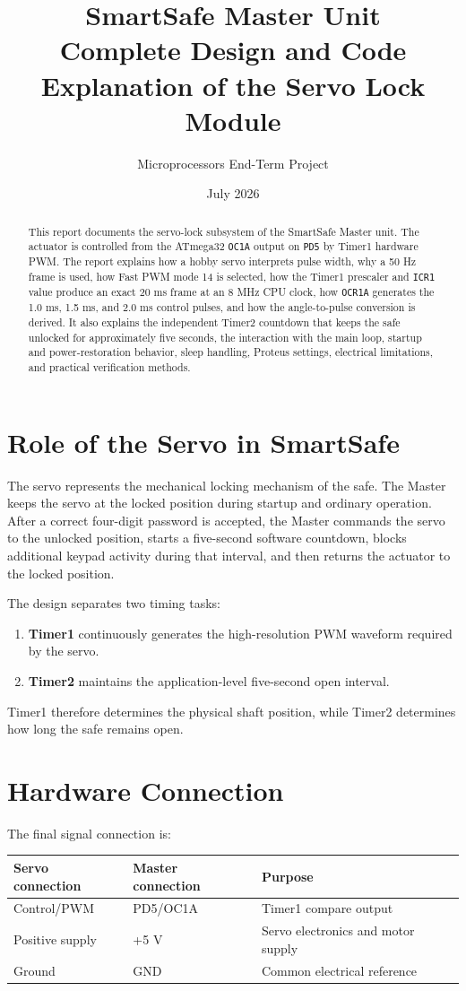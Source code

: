 \documentclass[11pt,a4paper]{article}
\title{\textbf{SmartSafe Master Unit}\\[4pt]
\Large Complete Design and Code Explanation of the Servo Lock Module}
\author{Microprocessors End-Term Project}
\date{July 2026}
\begin{document}
\maketitle
\thispagestyle{empty}

\begin{abstract}
This report documents the servo-lock subsystem of the SmartSafe Master unit. The actuator is controlled from the ATmega32 \texttt{OC1A} output on \texttt{PD5} by Timer1 hardware PWM. The report explains how a hobby servo interprets pulse width, why a 50 Hz frame is used, how Fast PWM mode 14 is selected, how the Timer1 prescaler and \texttt{ICR1} value produce an exact 20 ms frame at an 8 MHz CPU clock, how \texttt{OCR1A} generates the 1.0 ms, 1.5 ms, and 2.0 ms control pulses, and how the angle-to-pulse conversion is derived. It also explains the independent Timer2 countdown that keeps the safe unlocked for approximately five seconds, the interaction with the main loop, startup and power-restoration behavior, sleep handling, Proteus settings, electrical limitations, and practical verification methods.
\end{abstract}

\tableofcontents
\newpage

\section{Role of the Servo in SmartSafe}
The servo represents the mechanical locking mechanism of the safe. The Master keeps the servo at the locked position during startup and ordinary operation. After a correct four-digit password is accepted, the Master commands the servo to the unlocked position, starts a five-second software countdown, blocks additional keypad activity during that interval, and then returns the actuator to the locked position.

The design separates two timing tasks:
\begin{enumerate}
  \item \textbf{Timer1} continuously generates the high-resolution PWM waveform required by the servo.
  \item \textbf{Timer2} maintains the application-level five-second open interval.
\end{enumerate}
Timer1 therefore determines the physical shaft position, while Timer2 determines how long the safe remains open.

\section{Hardware Connection}
The final signal connection is:
\begin{center}
\begin{tabular}{lll}
\toprule
Servo connection & Master connection & Purpose \\
\midrule
Control/PWM & PD5/OC1A & Timer1 compare output \\
Positive supply & +5 V & Servo electronics and motor supply \\
Ground & GND & Common electrical reference \\
\bottomrule
\end{tabular}
\end{center}
\end{document}
